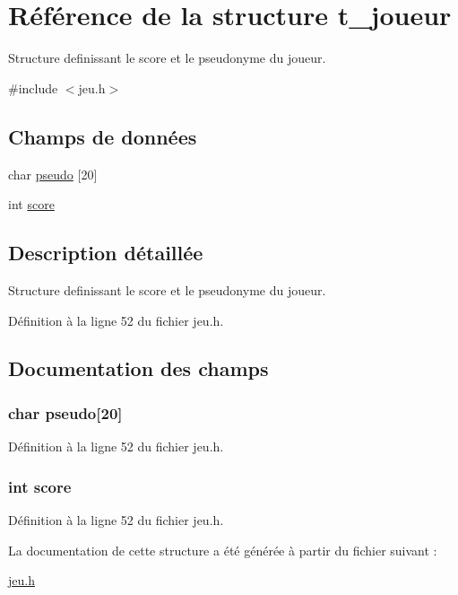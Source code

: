 \hypertarget{structt__joueur}{\section{Référence de la structure t\-\_\-joueur}
\label{structt__joueur}
}


Structure definissant le score et le pseudonyme du joueur.  




{\ttfamily \#include $<$jeu.\-h$>$}

\subsection*{Champs de données}
\begin{DoxyCompactItemize}
\item 
char \hyperlink{structt__joueur_a93f1b6ce36b864a94ee296223bf15432}{pseudo} \mbox{[}20\mbox{]}
\item 
int \hyperlink{structt__joueur_aef160b7437d94056f1dc59646cd5b87d}{score}
\end{DoxyCompactItemize}


\subsection{Description détaillée}
Structure definissant le score et le pseudonyme du joueur. 

Définition à la ligne 52 du fichier jeu.\-h.



\subsection{Documentation des champs}
\hypertarget{structt__joueur_a93f1b6ce36b864a94ee296223bf15432}{
\subsubsection[{pseudo}]{\setlength{\rightskip}{0pt plus 5cm}char pseudo\mbox{[}20\mbox{]}}}\label{structt__joueur_a93f1b6ce36b864a94ee296223bf15432}


Définition à la ligne 52 du fichier jeu.\-h.

\hypertarget{structt__joueur_aef160b7437d94056f1dc59646cd5b87d}{
\subsubsection[{score}]{\setlength{\rightskip}{0pt plus 5cm}int score}}\label{structt__joueur_aef160b7437d94056f1dc59646cd5b87d}


Définition à la ligne 52 du fichier jeu.\-h.



La documentation de cette structure a été générée à partir du fichier suivant \-:\begin{DoxyCompactItemize}
\item 
\hyperlink{jeu_8h}{jeu.\-h}\end{DoxyCompactItemize}
